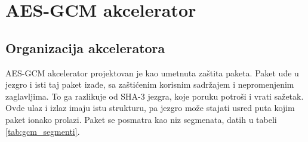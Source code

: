 \section{AES-GCM akcelerator}
\label{sec:hw_aesgcm}

\subsection{Organizacija akceleratora}
\label{subsec:hw_gcm_pregled}

AES-GCM akcelerator projektovan je kao umetnuta zaštita paketa. Paket uđe u jezgro i isti taj paket izađe, sa zaštićenim korisnim sadržajem i nepromenjenim zaglavljima. To ga razlikuje od SHA-3 jezgra, koje poruku potroši i vrati sažetak. Ovde ulaz i izlaz imaju istu strukturu, pa jezgro može stajati usred puta kojim paket ionako prolazi. Paket se posmatra kao niz segmenata, datih u tabeli \ref{tab:gcm_segmenti}.

\begin{table}[H]
\caption{Segmenti paketa u AES-GCM akceleratoru}
\centering
{}
\label{tab:gcm_segmenti}
\end{table}

